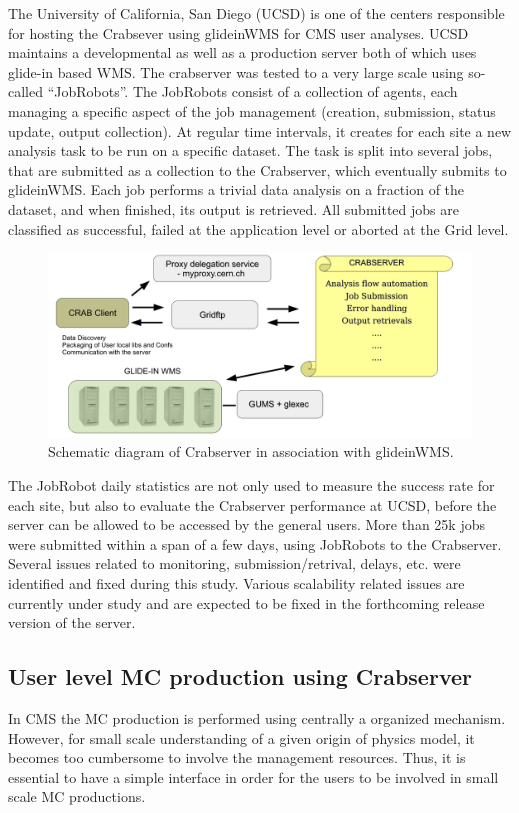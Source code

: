 \documentclass[a4paper]{jpconf}
\begin{document}
The University of California, San Diego (UCSD) is one of the centers responsible for hosting 
the Crabsever using glideinWMS for CMS user analyses. UCSD maintains a developmental as well 
as a production server both of which uses glide-in based WMS. The crabserver was tested to a very large 
scale using so-called ``JobRobots''. The JobRobots consist of a collection of agents, each 
managing a specific aspect of the job management (creation, submission, status
update, output collection). At regular time intervals, it creates for
each site a new analysis task to be run on a specific dataset. The
task is split into several jobs, that are submitted as a collection to
the Crabserver, which eventually submits to glideinWMS. Each job
performs a trivial data analysis on a fraction of the dataset, and when
finished, its output is retrieved. All submitted jobs are classified
as successful, failed at the application level or aborted at the Grid
level.
\begin{figure}
\begin{center}
\includegraphics[scale=0.4]{crabserver}
\end{center}
\caption{Schematic diagram of Crabserver in association with glideinWMS.}
\label{fig:crabserver}
\end{figure}
The JobRobot daily statistics are not only used to measure the success rate for each site, 
but also to evaluate the Crabserver performance at UCSD, before the server can be allowed 
to be accessed by the general users. More than 25k jobs were submitted within a span of a 
few days, using JobRobots to the Crabserver. Several issues related to monitoring, 
submission/retrival, delays, etc. were identified and fixed during this study. Various scalability
related issues are currently under study and are expected to be fixed in the forthcoming
release version of the server.
\subsection{User level MC production using Crabserver}
In CMS the MC production is performed using centrally a organized mechanism. However,
for small scale understanding of a given origin of physics model, it becomes too cumbersome
to involve the management resources. Thus, it is essential to have a simple interface
in order for the users to be involved in small scale MC productions. 
\end{document}
